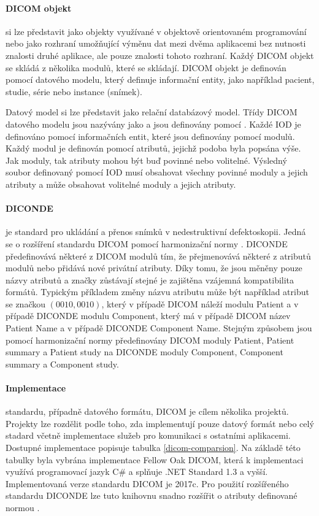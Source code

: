 \paragraph{DICOM objekt} si lze představit jako objekty využívané v objektově orientovaném programování nebo jako rozhraní umožňující výměnu dat mezi dvěma aplikacemi bez nutnosti znalosti druhé aplikace, ale pouze znalosti tohoto rozhraní. Každý DICOM objekt se skládá z několika modulů, které se skládají. DICOM objekt je definován pomocí datového modelu, který  
definuje informační entity, jako například pacient, studie, série nebo instance (snímek).

Datový model si lze představit jako relační databázový model. Třídy DICOM datového modelu jsou nazývány jako  a jsou definovány pomocí . Každé IOD je definováno pomocí informačních entit, které jsou definovány pomocí modulů. Každý modul je definován pomocí atributů, jejichž podoba byla popsána výše. Jak moduly, tak atributy mohou být buď povinné nebo volitelné. Výsledný soubor definovaný pomocí IOD musí obsahovat všechny povinné moduly a jejich atributy a může obsahovat volitelné moduly a jejich atributy.

\paragraph{DICONDE} je standard pro ukládání a přenos snímků v nedestruktivní defektoskopii. Jedná se o rozšíření standardu DICOM pomocí harmonizační normy \cite{diconde-standard}. DICONDE předefinovává některé z DICOM modulů tím, že přejmenovává některé z atributů modulů nebo přidává nové privátní atributy. Díky tomu, že jsou měněny pouze názvy atributů a značky zůstávají stejné je zajištěna vzájemná kompatibilita formátů. Typickým příkladem změny názvu atributu může být například atribut se značkou $(0010,0010)$, který v případě DICOM náleží modulu Patient a v případě DICONDE modulu Component, který má v případě DICOM název Patient Name a v případě DICONDE Component Name. Stejným způsobem jsou pomocí harmonizační normy předefinovány DICOM moduly Patient, Patient summary a Patient study na DICONDE moduly Component, Component summary a Component study.

\paragraph{Implementace} standardu, případně datového formátu, DICOM je cílem několika projektů. Projekty lze rozdělit podle toho, zda implementují pouze datový formát nebo celý stadard včetně implementace služeb pro komunikaci s ostatními aplikacemi. Dostupné implementace popisuje tabulka \ref{dicom-comparsion}. Na základě této tabulky byla vybrána implementace Fellow Oak DICOM, která k implementaci využívá programovací jazyk C\# a splňuje .NET Standard 1.3 a vyšší. Implementovaná verze standardu DICOM je 2017c. Pro použití rozšířeného standardu DICONDE lze tuto knihovnu snadno rozšířit o atributy definované normou \cite{diconde-standard}.

